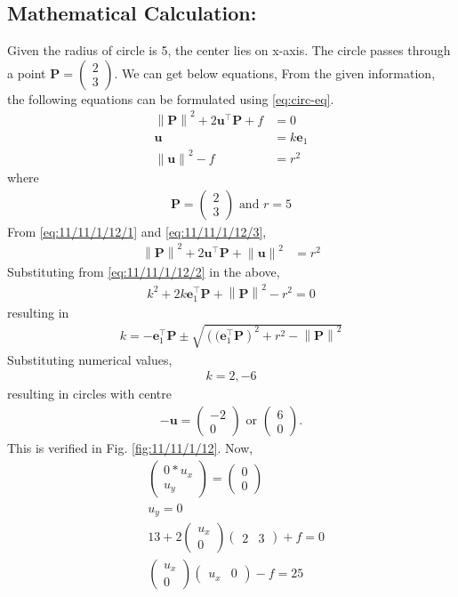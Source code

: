 \documentclass[a4paper,12pt,twocolumn]{article}
\providecommand{\norm}[1]{\left\lVert#1\right\rVert}
\let\vec\mathbf
\newcommand{\myvec}[1]{\ensuremath{\begin{pmatrix}#1\end{pmatrix}}}
\providecommand{\brak}[1]{\ensuremath{\left((#1\right)}}
\begin{document}
\subsection{Mathematical Calculation:}
Given the radius of circle is 5, the center lies on x-axis. The circle passes through a point $\vec{P} = \myvec{2\\3}$. We can get below equations,
\fi
From the given information, the following equations can be formulated
using 
	\eqref{eq:circ-eq}.
\begin{align}
		\label{eq:11/11/1/12/1}
	\norm{\vec{P}}^2 + 2 \vec{u}^{\top}\vec{P} + f &= 0
	\\
		\label{eq:11/11/1/12/2}
	\vec{u} &= k\vec{e}_1
	\\
		\label{eq:11/11/1/12/3}
	\norm{\vec{u}}^2 - f &= r^2
\end{align}
where 
\begin{align}
	\vec{P} = \myvec{2\\3} \text{ and } r = 5
\end{align}
From 
		\eqref{eq:11/11/1/12/1}
		and 
		\eqref{eq:11/11/1/12/3},
\begin{align}
	\norm{\vec{P}}^2 + 2 \vec{u}^{\top}\vec{P} + \norm{\vec{u}}^2 &= r^2
\end{align}
Substituting from 
		\eqref{eq:11/11/1/12/2} in the above, 
\begin{align}
	k^2  + 2k \vec{e}_1^{\top}\vec{P} + \norm{\vec{P}}^2- r^2 = 0
\end{align}
resulting in 
\begin{align}
	k =  - \vec{e}_1^{\top}\vec{P} \pm \sqrt{\brak{{ \vec{e}_1^{\top}\vec{P}  }}^2 + r^2 - \norm{\vec{P}}^2 } 
\end{align}
Substituting numerical values, 
\begin{align}
	k = 2, -6
\end{align}
resulting in circles with centre
\begin{align}
	-\vec{u} = \myvec{-2 \\ 0} \text{ or } \myvec{6 \\ 0}.
\end{align}
This is verified in Fig. 
		\eqref{fig:11/11/1/12}.
\iffalse
Now,
\begin{align}
	&\myvec{0*u_x\\u_y} = \myvec{0\\0}\\
	&u_y=0\\
	&13+2\myvec{u_x\\0}\myvec{2 &3}+f = 0\\
	&\myvec{u_x\\0}\myvec{u_x &0} - f = 25
\end{align}
\end{document}
